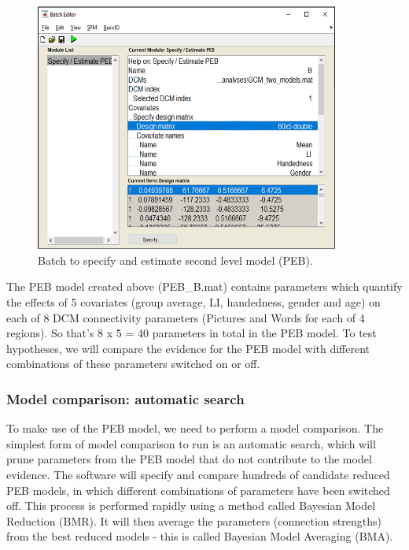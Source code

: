 \documentclass{article}
\begin{document}
\begin{figure}[ht]
\begin{center}
\includegraphics[width=10cm]{"Fig_batch_specify_peb"}
\caption{Batch to specify and estimate second level model (PEB). \label{Fig_batch_specify_peb}}
\end{center}
\end{figure}

The PEB model created above (PEB\_B.mat) contains parameters which quantify the effects of 5 covariates (group average, LI, handedness, gender and age) on each of 8 DCM connectivity parameters (Pictures and Words for each of 4 regions). So that's 8 x 5 = 40 parameters in total in the PEB model. To test hypotheses, we will compare the evidence for the PEB model with different combinations of these  parameters switched on or off.

\subsubsection{Model comparison: automatic search} \label{GUI_search}

To make use of the PEB model, we need to perform a model comparison. The simplest form of model comparison to run is an automatic search, which will prune parameters from the PEB model that do not contribute to the model evidence. The software will specify and compare hundreds of candidate reduced PEB models, in which different combinations of parameters have been switched off. This process is performed rapidly using a method called Bayesian Model Reduction (BMR). It will then average the parameters (connection strengths) from the best reduced models - this is called Bayesian Model Averaging (BMA).
\end{document}
